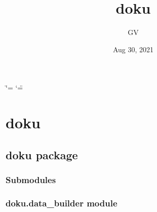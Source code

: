 \documentclass[letterpaper,10pt,english]{sphinxmanual}
\title{doku}
\date{Aug 30, 2021}
\author{GV}
\begin{document}
\ifdefined\shorthandoff
  \ifnum\catcode`\=\string=\active\shorthandoff{=}\fi
  \ifnum\catcode`\"=\active{}\fi
\fi

\pagestyle{empty}
\sphinxmaketitle
\pagestyle{plain}
\sphinxtableofcontents
\pagestyle{normal}
\label{\detokenize{index::doc}}



\chapter{doku}
\label{\detokenize{modules:doku}}\label{\detokenize{modules::doc}}

\section{doku package}
\label{\detokenize{doku:doku-package}}\label{\detokenize{doku::doc}}

\subsection{Submodules}
\label{\detokenize{doku:submodules}}

\subsection{doku.data\_builder module}
\label{\detokenize{doku:module-doku.data_builder}}\label{\detokenize{doku:doku-data-builder-module}}
\end{document}
